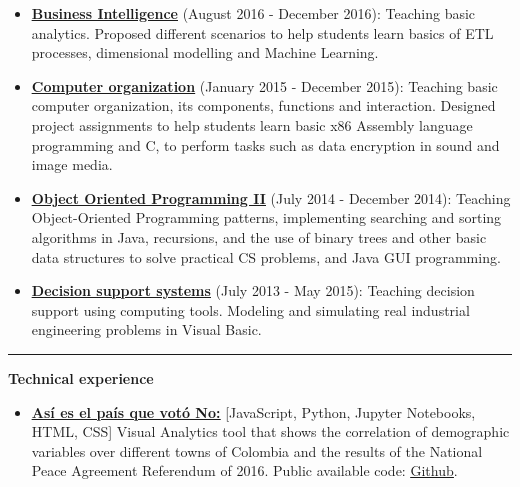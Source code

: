 \documentclass[10pt]{article}
\begin{document}
{\begin{itemize}
    \item \textcolor{blue}{\href{https://sistemasacademico.uniandes.edu.co/~isis3301/dokuwiki/doku.php}{\underline{\textbf{Business Intelligence}}}} (August 2016 - December 2016):
	Teaching basic analytics. Proposed different scenarios to help students learn basics of \textsc{ETL} processes, dimensional modelling and Machine Learning.
	\item \textcolor{blue}{\href{https://sistemasacademico.uniandes.edu.co/~isis1304/dokuwiki/doku.php}{\underline{\textbf{Computer organization}}}} (January 2015 - December 2015):
	Teaching basic computer organization, its components, functions and interaction. Designed project assignments to help students learn basic x86 Assembly language programming and  C, to perform tasks such as data encryption in sound and image media. 
	\item \textcolor{blue}{\href{https://sistemasacademico.uniandes.edu.co/~isis1205/dokuwiki/doku.php}{\underline{\textbf{Object Oriented Programming II}}}} (July 2014 - December 2014):
	Teaching Object-Oriented Programming patterns, implementing searching and sorting algorithms in Java, recursions, and the use of binary trees and other basic data structures to solve practical CS problems, and Java GUI programming.
	\item \textcolor{blue}{\href{http://catalogo.uniandes.edu.co/2014/Catalog/Courses/IIND/2000/IIND-2109}{\underline{\textbf{Decision support systems}}}} (July 2013 - May 2015):
	Teaching decision support using computing tools. Modeling and simulating real industrial engineering problems in Visual Basic.
\end{itemize}



\vspace{0.25cm}
\hrule
\vspace{0.25cm}
{\large \textbf{Technical experience}}
\vspace{0.25cm}
{\footnotesize\begin{itemize}

\item \textcolor{blue}{\href{http://bl.ocks.org/mvanegas10/raw/3bd6d116da4ed96d212e783060720c5d/}{\underline{\textbf{Así es el país que votó No:}}}} [JavaScript, Python, Jupyter Notebooks, \textsc{HTML}, \textsc{CSS}]  Visual Analytics tool that shows the correlation of demographic variables over different towns of Colombia and the results of the National Peace Agreement Referendum of 2016. Public available code: \textcolor{blue}{\href{https://github.com/mvanegas10/Plebiscito-Colombia-2016}{\underline{Github}}}.


\end{itemize}}}
\end{document}
